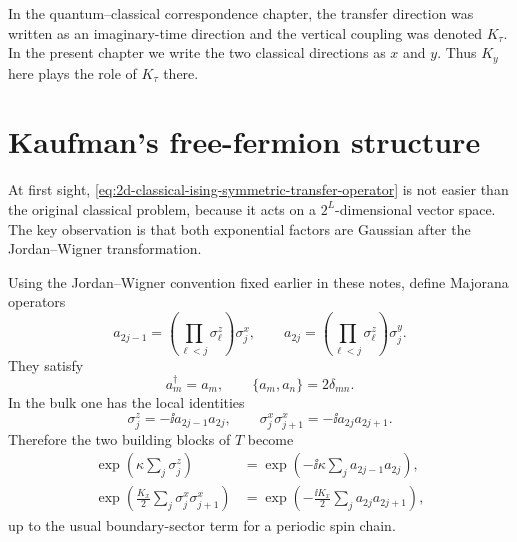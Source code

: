 \begin{remark}
In the quantum--classical correspondence chapter, the transfer direction was
written as an imaginary-time direction and the vertical coupling was denoted
$K_\tau$.  In the present chapter we write the two classical directions as
$x$ and $y$.  Thus $K_y$ here plays the role of $K_\tau$ there.
\end{remark}

\section{Kaufman's free-fermion structure}
\label{sec:2d-classical-ising-kaufman-free-fermion}

At first sight, \cref{eq:2d-classical-ising-symmetric-transfer-operator} is not
easier than the original classical problem, because it acts on a
$2^L$-dimensional vector space.  The key observation is that both exponential
factors are Gaussian after the Jordan--Wigner transformation.

Using the Jordan--Wigner convention fixed earlier in these notes, define
Majorana operators
\begin{equation}
\label{eq:2d-classical-ising-majorana-definitions}
    a_{2j-1}
    =
    \left(\prod_{\ell<j}\sigma_\ell^z\right)\sigma_j^x,
    \qquad
    a_{2j}
    =
    \left(\prod_{\ell<j}\sigma_\ell^z\right)\sigma_j^y .
\end{equation}
They satisfy
\begin{equation}
\label{eq:2d-classical-ising-majorana-algebra}
    a_m^\dagger=a_m,
    \qquad
    \{a_m,a_n\}=2\delta_{mn} .
\end{equation}
In the bulk one has the local identities
\begin{equation}
\label{eq:2d-classical-ising-majorana-spin-identities}
    \sigma_j^z=-\ii a_{2j-1}a_{2j},
    \qquad
    \sigma_j^x\sigma_{j+1}^x=-\ii a_{2j}a_{2j+1} .
\end{equation}
Therefore the two building blocks of $T$ become
\begin{align}
\label{eq:2d-classical-ising-vertical-majorana-gaussian}
    \exp\left(\kappa\sum_j\sigma_j^z\right)
    &=
    \exp\left(-\ii\kappa\sum_j a_{2j-1}a_{2j}\right),
    \\
\label{eq:2d-classical-ising-horizontal-majorana-gaussian}
    \exp\left(\frac{K_x}{2}\sum_j\sigma_j^x\sigma_{j+1}^x\right)
    &=
    \exp\left(-\frac{\ii K_x}{2}\sum_j a_{2j}a_{2j+1}\right),
\end{align}
up to the usual boundary-sector term for a periodic spin chain.


